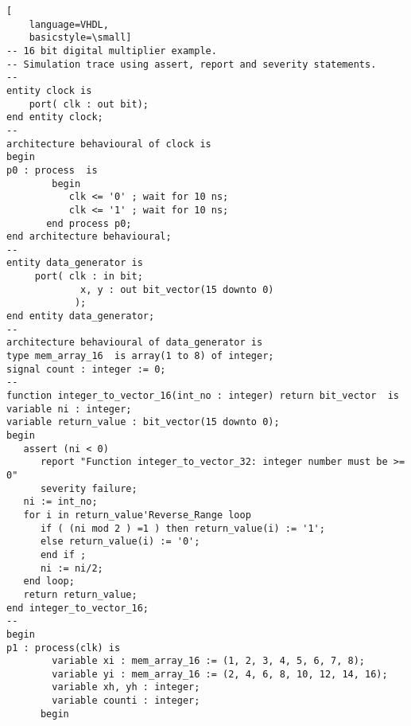 \begin{lstlisting}[
    language=VHDL,
    basicstyle=\small]
-- 16 bit digital multiplier example.
-- Simulation trace using assert, report and severity statements.
--
entity clock is
    port( clk : out bit);
end entity clock;
--
architecture behavioural of clock is
begin
p0 : process  is
        begin
           clk <= '0' ; wait for 10 ns;
           clk <= '1' ; wait for 10 ns;
       end process p0;
end architecture behavioural;
--
entity data_generator is
     port( clk : in bit;
             x, y : out bit_vector(15 downto 0)
            );
end entity data_generator;
--
architecture behavioural of data_generator is
type mem_array_16  is array(1 to 8) of integer;
signal count : integer := 0;
--
function integer_to_vector_16(int_no : integer) return bit_vector  is
variable ni : integer;
variable return_value : bit_vector(15 downto 0);
begin
   assert (ni < 0)
      report "Function integer_to_vector_32: integer number must be >= 0"
      severity failure;
   ni := int_no;
   for i in return_value'Reverse_Range loop 
      if ( (ni mod 2 ) =1 ) then return_value(i) := '1';
      else return_value(i) := '0';
      end if ;
      ni := ni/2;
   end loop;
   return return_value;
end integer_to_vector_16;
--
begin
p1 : process(clk) is
        variable xi : mem_array_16 := (1, 2, 3, 4, 5, 6, 7, 8);
        variable yi : mem_array_16 := (2, 4, 6, 8, 10, 12, 14, 16);
        variable xh, yh : integer;
        variable counti : integer;
      begin


\end{lstlisting}
